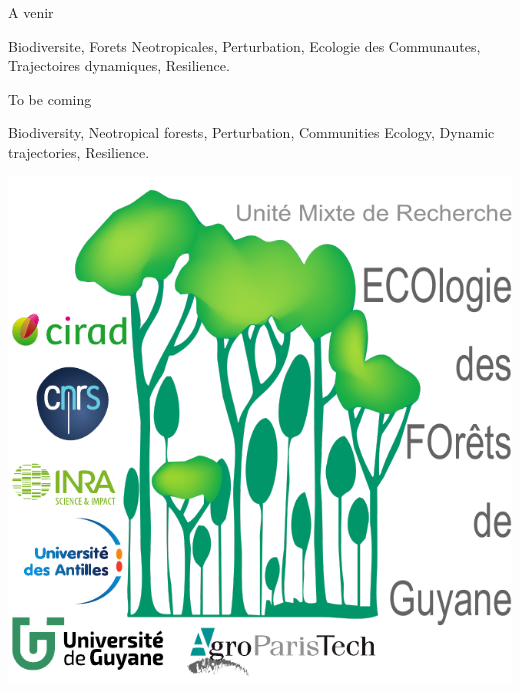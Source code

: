 \documentclass[
  11pt,
  french,
  A4paper,
  extrafontsizes,onecolumn,openright
  ]{memoir}
\begin{document}

\backmatter
\SmallMargins

%
\printbibliography










\evenpage
\SmallMargins
\thispagestyle{empty}

\begin{normalsize}

\begin{description}

\item[Résumé:]
A venir

\item[Mots clés :]
Biodiversite, Forets Neotropicales, Perturbation, Ecologie des Communautes, Trajectoires dynamiques, Resilience.
~\\

\item[Abstract:]
To be coming

\item[Keywords:]
Biodiversity, Neotropical forests, Perturbation, Communities Ecology, Dynamic trajectories, Resilience.

\end{description}

\end{normalsize}

\vspace*{\fill}
\centering\includegraphics[width=.3\textwidth]{images/Logo-Lab}
\end{document}
